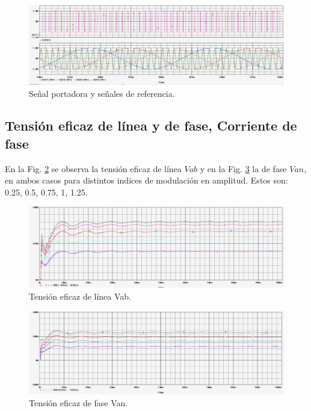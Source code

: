\documentclass[11pt, a4paper]{article}
\begin{document}
\begin{figure}[h!]
	\centering
	\includegraphics[width=15cm]{primer/Entrada_vs_rampa}
	\caption{Señal portadora y señales de referencia.}
	\label{fig:VsinVtrian}
\end{figure} 

\subsection{Tensión eficaz de línea y de fase, Corriente de fase}
En la Fig. \ref{fig:VabRMS} se observa la tensión eficaz de línea $Vab$ y en la Fig. \ref{fig:VanRMS} la de fase $Van$, en ambos casos para distintos indices de modulación en amplitud. Estos son: 0.25, 0.5, 0.75, 1, 1.25.

\begin{figure}[h!]
	\centering
	\includegraphics[width=15cm]{primer/RMSLinea}
	\caption{Tensión eficaz de línea Vab.}
	\label{fig:VabRMS}
\end{figure}

\begin{figure}[h!]
	\centering
	\includegraphics[width=15cm]{primer/RMSfase}
	\caption{Tensión eficaz de fase Van.}
	\label{fig:VanRMS}
\end{figure}
\end{document}
